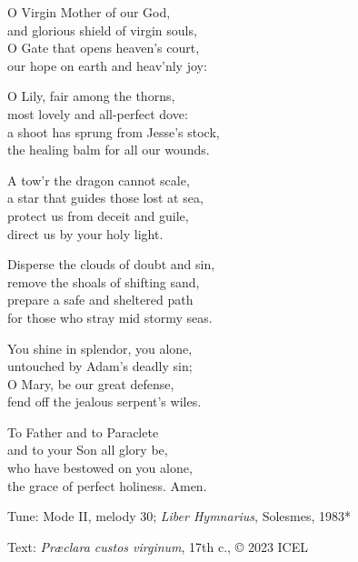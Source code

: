 \hymn

\settowidth{\versewidth}{a shoot has sprung from Jesse’s stock,}

\begin{hymnverse}[\versewidth]
O Virgin Mother of our God,\\
and glorious shield of virgin souls,\\
O Gate that opens heaven’s court,\\
our hope on earth and heav’nly joy:

O Lily, fair among the thorns,\\
most lovely and all-perfect dove:\\
a shoot has sprung from Jesse’s stock,\\
the healing balm for all our wounds.

A tow’r the dragon cannot scale,\\
a star that guides those lost at sea,\\
protect us from deceit and guile,\\
direct us by your holy light.

Disperse the clouds of doubt and sin,\\
remove the shoals of shifting sand,\\
prepare a safe and sheltered path\\
for those who stray mid stormy seas.

You shine in splendor, you alone,\\
untouched by Adam’s deadly sin;\\
O Mary, be our great defense,\\
fend off the jealous serpent’s wiles.

To Father and to Paraclete\\
and to your Son all glory be,\\
who have bestowed on you alone,\\
the grace of perfect holiness. Amen.
\end{hymnverse}

\begin{hymnsource}
Tune: Mode II, melody 30; \emph{Liber Hymnarius}, Solesmes, 1983*

Text: \emph{Præclara custos virginum}, 17th c., © 2023 ICEL

 


\end{hymnsource}